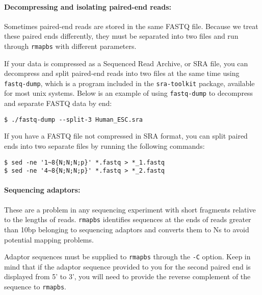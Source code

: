 \documentclass[10pt]{article}
\newcommand{\prog}[1]{\texttt{#1}}
\newcommand{\op}[1]{\texttt{#1}}
\begin{document}
\paragraph{Decompressing and isolating paired-end reads:}
Sometimes paired-end reads are stored in the same FASTQ file.  Because
we treat these paired ends differently, they must be separated into
two files and run through \prog{rmapbs} with different parameters.

If your data is compressed as a Sequenced Read Archive, or SRA file, you can
decompress and split paired-end reads into two files at the same time using
 \prog{fastq-dump}, which is a program included in the \prog{sra-toolkit} 
package, available for most unix systems.  Below is an example of using
\prog{fastq-dump} to decompress and separate FASTQ data by end:
\begin{verbatim}
$ ./fastq-dump --split-3 Human_ESC.sra
\end{verbatim}

If you have a FASTQ file not compressed in SRA format, you can split paired ends
into two separate files by running the following commands:
\begin{verbatim}
$ sed -ne '1~8{N;N;N;p}' *.fastq > *_1.fastq
$ sed -ne '4~8{N;N;N;p}' *.fastq > *_2.fastq
\end{verbatim}

\paragraph{Sequencing adaptors:}
These are a problem in any sequencing experiment with short fragments
relative to the lengths of reads.  \prog{rmapbs} identifies sequences at the
ends of reads greater than 10bp belonging to sequencing adaptors and
converts them to Ns to avoid potential mapping problems.

Adaptor sequences must be supplied to \prog{rmapbs} through the \op{-C}
option.  Keep in mind that if the adaptor sequence provided to you for
the second paired end is displayed from 5' to 3', you will need to
provide the reverse complement of the sequence to \prog{rmapbs}.



\end{document}
